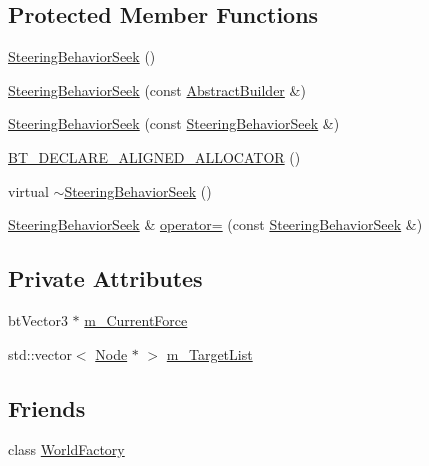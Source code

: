 \subsection*{Protected Member Functions}
\begin{DoxyCompactItemize}
\item 
\mbox{\hyperlink{classnjli_1_1_steering_behavior_seek_ae54f6222ce8599dbc60558269d809528}{Steering\+Behavior\+Seek}} ()
\item 
\mbox{\hyperlink{classnjli_1_1_steering_behavior_seek_ad41808a92e0dc2ad419989b8207cb015}{Steering\+Behavior\+Seek}} (const \mbox{\hyperlink{classnjli_1_1_abstract_builder}{Abstract\+Builder}} \&)
\item 
\mbox{\hyperlink{classnjli_1_1_steering_behavior_seek_a435d9a81b4d904919f4e0f85969aa58c}{Steering\+Behavior\+Seek}} (const \mbox{\hyperlink{classnjli_1_1_steering_behavior_seek}{Steering\+Behavior\+Seek}} \&)
\item 
\mbox{\hyperlink{classnjli_1_1_steering_behavior_seek_ae5227878a02961a95ee1e7e26ea0d543}{B\+T\+\_\+\+D\+E\+C\+L\+A\+R\+E\+\_\+\+A\+L\+I\+G\+N\+E\+D\+\_\+\+A\+L\+L\+O\+C\+A\+T\+OR}} ()
\item 
virtual \mbox{\hyperlink{classnjli_1_1_steering_behavior_seek_aa7709ae66857d3b412e8d7b951451fe3}{$\sim$\+Steering\+Behavior\+Seek}} ()
\item 
\mbox{\hyperlink{classnjli_1_1_steering_behavior_seek}{Steering\+Behavior\+Seek}} \& \mbox{\hyperlink{classnjli_1_1_steering_behavior_seek_a97b14bd488e252cbf0b31d8ed7b6b25f}{operator=}} (const \mbox{\hyperlink{classnjli_1_1_steering_behavior_seek}{Steering\+Behavior\+Seek}} \&)
\end{DoxyCompactItemize}
\subsection*{Private Attributes}
\begin{DoxyCompactItemize}
\item 
bt\+Vector3 $\ast$ \mbox{\hyperlink{classnjli_1_1_steering_behavior_seek_a0c7b5158b2734da4d1e529c26a465eba}{m\+\_\+\+Current\+Force}}
\item 
std\+::vector$<$ \mbox{\hyperlink{classnjli_1_1_node}{Node}} $\ast$ $>$ \mbox{\hyperlink{classnjli_1_1_steering_behavior_seek_a76ef2bc86a59cbbba22ab57c0d0ffce9}{m\+\_\+\+Target\+List}}
\end{DoxyCompactItemize}
\subsection*{Friends}
\begin{DoxyCompactItemize}
\item 
class \mbox{\hyperlink{classnjli_1_1_steering_behavior_seek_acb96ebb09abe8f2a37a915a842babfac}{World\+Factory}}
\end{DoxyCompactItemize}
